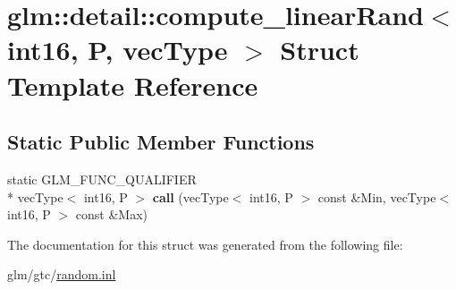 \hypertarget{structglm_1_1detail_1_1compute__linearRand_3_01int16_00_01P_00_01vecType_01_4}{\section{glm\-:\-:detail\-:\-:compute\-\_\-linear\-Rand$<$ int16, P, vec\-Type $>$ Struct Template Reference}
\label{structglm_1_1detail_1_1compute__linearRand_3_01int16_00_01P_00_01vecType_01_4}
}
\subsection*{Static Public Member Functions}
\begin{DoxyCompactItemize}
\item 
\hypertarget{structglm_1_1detail_1_1compute__linearRand_3_01int16_00_01P_00_01vecType_01_4_a2cf2a727838709537e66cef0fe48b236}{static G\-L\-M\-\_\-\-F\-U\-N\-C\-\_\-\-Q\-U\-A\-L\-I\-F\-I\-E\-R \\*
vec\-Type$<$ int16, P $>$ {\bfseries call} (vec\-Type$<$ int16, P $>$ const \&Min, vec\-Type$<$ int16, P $>$ const \&Max)}\label{structglm_1_1detail_1_1compute__linearRand_3_01int16_00_01P_00_01vecType_01_4_a2cf2a727838709537e66cef0fe48b236}

\end{DoxyCompactItemize}


The documentation for this struct was generated from the following file\-:\begin{DoxyCompactItemize}
\item 
glm/gtc/\hyperlink{random_8inl}{random.\-inl}\end{DoxyCompactItemize}
